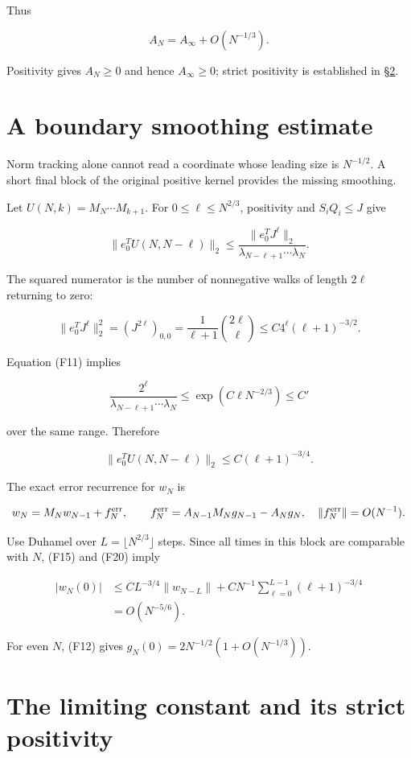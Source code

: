 \documentclass[11pt,letterpaper]{article}
\numberwithin{equation}{section}
\theoremstyle{remark}
\begin{document}
Thus

\[
A_N=A_\infty+O(N^{-1/3}).
\tag{F19}
\]

Positivity gives \(A_N\ge 0\) and hence \(A_\infty \ge 0\); strict positivity is established in \S\ref{air:rb:the-limiting-constant-and-its-strict-positivity}.

\section{A boundary smoothing estimate}\label{air:rb:a-boundary-smoothing-estimate}

Norm tracking alone cannot read a coordinate whose leading size is \(N^{-1/2}\). A short final block of the original positive kernel provides the missing smoothing.

Let \(U(N,k)=M_N\cdots M_{k+1}\). For \(0\le \ell \le N^{2/3}\), positivity and \(S_iQ_i\le J\) give

\[
\|e_0^TU(N,N-\ell)\|_2
\le\frac{\|e_0^TJ^\ell\|_2}
{\lambda_{N-\ell+1}\cdots\lambda_N}.
\]

The squared numerator is the number of nonnegative walks of length \(2\ell\) returning to zero:

\[
\|e_0^TJ^\ell\|_2^2=(J^{2\ell})_{0,0}
=\frac{1}{\ell+1}\binom{2\ell}{\ell}
\le C4^\ell(\ell+1)^{-3/2}.
\]

Equation (F11) implies

\[
\frac{2^\ell}{\lambda_{N-\ell+1}\cdots\lambda_N}
\le\exp(C\ell N^{-2/3})\le C'
\]

over the same range. Therefore

\[
\|e_0^TU(N,N-\ell)\|_2\le C(\ell+1)^{-3/4}.
\tag{F20}
\]

The exact error recurrence for \(w_N\) is

\[
w_N=M_Nw_{N-1}+f_N^{\rm err},\qquad
f_N^{\rm err}=A_{N-1}M_Ng_{N-1}-A_Ng_N,
\quad \|f_N^{\rm err}\|=O(N^{-1}).
\]

Use Duhamel over \(L=\lfloor N^{2/3}\rfloor\) steps. Since all times in this block are comparable with \(N\), (F15) and (F20) imply

\[
\begin{aligned}
|w_N(0)|
&\le CL^{-3/4}\|w_{N-L}\|
+CN^{-1}\sum_{\ell=0}^{L-1}(\ell+1)^{-3/4}\\
&=O(N^{-5/6}).
\end{aligned}
\tag{F21}
\]

For even \(N\), (F12) gives \(g_N(0)=2N^{-1/2}(1+O(N^{-1/3}))\).

\section{The limiting constant and its strict positivity}\label{air:rb:the-limiting-constant-and-its-strict-positivity}
\end{document}
